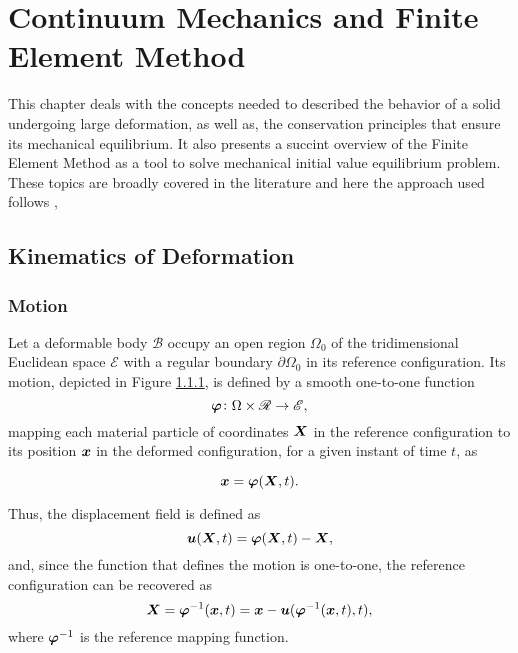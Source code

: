 \chapter{Continuum Mechanics and Finite Element Method}

This chapter deals with the concepts needed to described the behavior of a solid undergoing large deformation, as well as, the conservation principles that ensure its mechanical equilibrium.
It also presents a succint overview of the Finite Element Method as a tool to solve mechanical initial value equilibrium problem.
These topics are broadly covered in the literature and here the approach used follows \cite{de2011computational},

\section{Kinematics of Deformation}

\subsection{Motion}

Let a deformable body $\mathscr{B}$ occupy an open region $\Omega_0$ of the tridimensional Euclidean space $\mathscr{E}$ with a regular boundary $\partial \Omega_0$ in its reference configuration.
Its motion, depicted in Figure \ref{}, is defined by a smooth one-to-one function
\begin{equation}
    \bm{\varphi}\colon \Omega\times \mathscr{R}\to \mathscr{E},
\end{equation}
mapping each material particle of coordinates $\bm{X}$ in the reference configuration to its position $\bm{x}$ in the deformed configuration, for a given instant of time $t$, as
\begin{highlight}
    \begin{equation}
        \bm{x} = \bm{\varphi}(\bm{X}, t).
    \end{equation}
\end{highlight}

\enlargethispage{\baselineskip}
Thus, the displacement field is defined as
\begin{equation}
    \bm{u}(\bm{X}, t) = \bm{\varphi}(\bm{X}, t) - \bm{X},
\end{equation}
and, since the function that defines the motion is one-to-one, the reference configuration can be recovered as
\begin{equation}
    \bm{X} = \bm{\varphi}^{-1} (\bm{x}, t) = \bm{x} - \bm{u}(\bm{\varphi}^{-1}(\bm{x}, t),t),
\end{equation}
where $\bm{\varphi}^{-1}$ is the reference mapping function.

